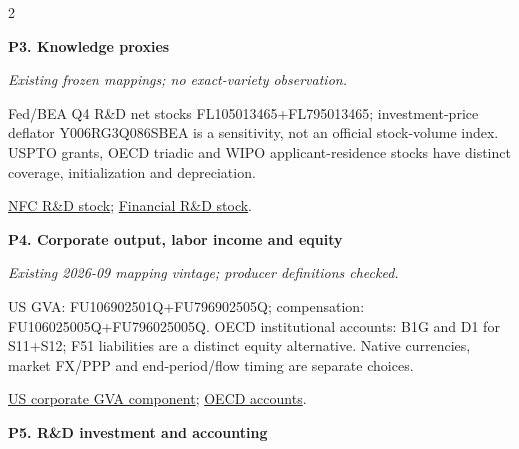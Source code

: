 \documentclass[10pt,a4paper,landscape]{article}
\begin{document}
\begin{multicols}{2}
\noindent\begin{minipage}{\linewidth}\raggedright

\hypertarget{src-P3}{\textbf{P3. Knowledge proxies}}\par

{\footnotesize\itshape Existing frozen mappings; no exact-variety observation.}\par

Fed/BEA Q4 R\&D net stocks FL105013465+FL795013465; investment-price deflator Y006RG3Q086SBEA is a sensitivity, not an official stock-volume index. USPTO grants, OECD triadic and WIPO applicant-residence stocks have distinct coverage, initialization and depreciation.

\par \href{https://fred.stlouisfed.org/series/BOGZ1FL105013465Q}{NFC R\&D stock}; \href{https://fred.stlouisfed.org/series/BOGZ1FL795013465Q}{Financial R\&D stock}.

\end{minipage}\par\vspace{6pt}

\noindent\begin{minipage}{\linewidth}\raggedright

\hypertarget{src-P4}{\textbf{P4. Corporate output, labor income and equity}}\par

{\footnotesize\itshape Existing 2026-09 mapping vintage; producer definitions checked.}\par

US GVA: FU106902501Q+FU796902505Q; compensation: FU106025005Q+FU796025005Q. OECD institutional accounts: B1G and D1 for S11+S12; F51 liabilities are a distinct equity alternative. Native currencies, market FX/PPP and end-period/flow timing are separate choices.

\par \href{https://fred.stlouisfed.org/series/BOGZ1FU106902501Q}{US corporate GVA component}; \href{https://www.oecd.org/en/publications/national-accounts-of-oecd-countries_2221433x.html}{OECD accounts}.

\end{minipage}\par\vspace{6pt}

\noindent\begin{minipage}{\linewidth}\raggedright

\hypertarget{src-P5}{\textbf{P5. R\&D investment and accounting}}\par


\end{minipage}
\end{multicols}
\end{document}
